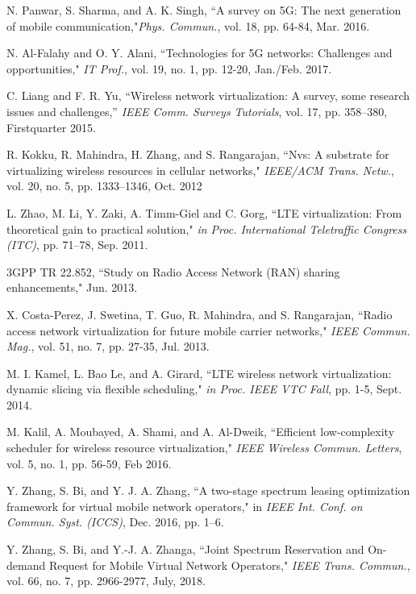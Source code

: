 \documentclass[journal]{IEEEtran}
\begin{document}
\begin{thebibliography}{1}	
N. Panwar, S. Sharma, and A. K. Singh, ``A survey on 5G: The
next generation of mobile communication,"\emph{Phys. Commun.}, vol. 18, pp. 64-84, Mar. 2016.	
	
N. Al-Falahy and O. Y. Alani, ``Technologies for 5G networks:
Challenges and opportunities," \emph{IT Prof.}, vol. 19, no. 1, pp. 12-20, Jan./Feb. 2017.	
	
	
C. Liang and F. R. Yu, ``Wireless network virtualization: A survey, some research issues and challenges,” \emph{IEEE Comm. Surveys Tutorials}, vol. 17, pp. 358–380, Firstquarter 2015.

R. Kokku, R. Mahindra, H. Zhang, and S. Rangarajan, ``Nvs: A substrate
for virtualizing wireless resources in cellular networks," \emph{IEEE/ACM Trans. Netw.}, vol. 20, no. 5, pp. 1333–1346, Oct. 2012

L. Zhao, M. Li, Y. Zaki, A. Timm-Giel and C. Gorg, ``LTE virtualization:
From theoretical gain to practical solution," \emph{in Proc. International Teletraffic Congress (ITC)}, pp. 71–78, Sep. 2011.


3GPP TR 22.852, ``Study on Radio Access Network (RAN) sharing enhancements," Jun. 2013.

X. Costa-Perez, J. Swetina, T. Guo, R. Mahindra, and S. Rangarajan, ``Radio access network virtualization for future mobile carrier networks," \emph{IEEE Commun. Mag.}, vol. 51, no. 7, pp. 27-35, Jul. 2013.

M. I. Kamel, L. Bao Le, and A. Girard, ``LTE wireless network virtualization: dynamic slicing via flexible scheduling," \emph{in Proc. IEEE VTC Fall}, pp. 1-5, Sept. 2014.

M. Kalil, A. Moubayed, A. Shami, and A. Al-Dweik, ``Efficient low-complexity scheduler for wireless resource virtualization," \emph{IEEE Wireless Commun. Letters}, vol. 5, no. 1, pp. 56-59, Feb 2016.
	
Y. Zhang, S. Bi, and Y. J. A. Zhang, ``A two-stage spectrum leasing optimization framework for virtual mobile network operators," in \emph{IEEE Int. Conf. on Commun. Syst. (ICCS)}, Dec. 2016, pp. 1–6.

Y. Zhang, S. Bi, and Y.-J. A. Zhanga, ``Joint Spectrum Reservation and On-demand Request for Mobile Virtual Network Operators," \emph{IEEE Trans. Commun.}, vol. 66, no. 7, pp. 2966-2977, July, 2018.	
	

\end{thebibliography}
\end{document}
